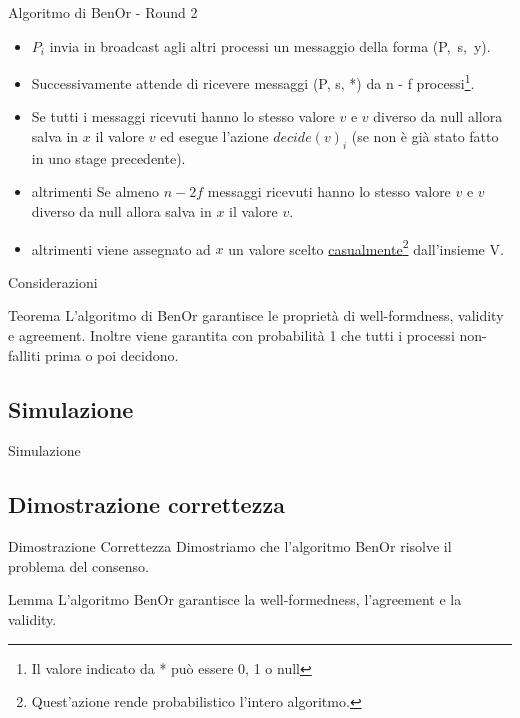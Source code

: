 \documentclass{beamer}
\begin{document}
    \begin{frame}{Algoritmo di BenOr - Round 2}

        \begin{itemize}
            \item $P_{i}$ invia in broadcast agli altri processi un messaggio della forma \mbox{(P, s, y)}.

            \item Successivamente attende di ricevere messaggi (P, s, *) da n - f processi\footnote{Il valore indicato da * può essere 0, 1 o null}.

            \item Se tutti i messaggi ricevuti hanno lo stesso valore $v$ e $v$ diverso da null allora salva in $x$ il valore $v$ ed esegue l'azione $decide(v)_{i}$ (se non è già stato fatto in uno stage precedente).

            \item altrimenti Se almeno $n - 2f$ messaggi ricevuti hanno lo stesso valore $v$ e $v$ diverso da null allora salva in $x$ il valore $v$.

            \item altrimenti viene assegnato ad $x$ un valore scelto \underline{casualmente}\footnote{Quest'azione rende probabilistico l'intero algoritmo.} dall'insieme V.
        \end{itemize}
    \end{frame}



\begin{frame}{Considerazioni}
    \begin{block}{Teorema}
        L'algoritmo di BenOr garantisce le proprietà di well-formdness, validity e agreement. Inoltre viene garantita con probabilità 1 che tutti i processi non-falliti prima o poi decidono.
    \end{block}
\end{frame}

\subsection{Simulazione}
\begin{frame}{Simulazione}
\end{frame}

\subsection{Dimostrazione correttezza}
\begin{frame}{Dimostrazione Correttezza}
    Dimostriamo che l'algoritmo BenOr risolve il problema del consenso.
    
    \begin{block}{Lemma}
        L'algoritmo BenOr garantisce la well-formedness, l'agreement e la validity.
    \end{block}
\end{frame}
\end{document}
